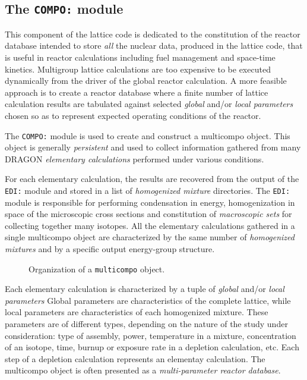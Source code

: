 \subsection{The {\tt COMPO:} module}\label{sect:COMPOData}

This component of the lattice code is dedicated to the constitution of the
reactor database intended to store {\sl all} the nuclear data, produced in
the lattice code, that is useful
in reactor calculations including fuel management and space-time kinetics.
Multigroup lattice calculations are too expensive to be executed dynamically
from the driver of the global reactor calculation. A more feasible
approach is to create a reactor database where a finite number of lattice
calculation results are tabulated against selected {\sl global} and/or {\sl local parameters}
chosen so as to represent expected operating conditions of the reactor.

\vskip 0.1cm

The {\tt COMPO:} module is used to create and construct a {\sc multicompo} object.
This object is generally {\sl persistent} and used to collect information gathered
from many DRAGON {\sl elementary calculations} performed under various conditions.

\vskip 0.1cm

For each elementary calculation, the results are recovered from the output of the
{\tt EDI:} module and stored in a list of {\sl homogenized mixture}
directories. The {\tt EDI:} module is responsible for performing condensation
in energy, homogenization in space of the microscopic cross sections and constitution
of {\sl macroscopic sets} for collecting together many isotopes. All the elementary
calculations gathered in a single {\sc multicompo} object are characterized by the same
number of {\sl homogenized mixtures} and by a specific output energy-group structure.

\vskip 0.1cm

\begin{figure}[h!]
\begin{center} 
\epsfxsize=9cm
\centerline{ }
\parbox{15cm}{\caption{Organization of a {\tt multicompo} 
object.}\label{fig:compo}}   
\end{center}  
\end{figure}

Each elementary calculation is characterized by a tuple of {\sl global} and/or {\sl local parameters}
Global parameters are characteristics of the complete lattice, while local parameters
are characteristics of each homogenized mixture. These parameters are of different types,
depending on the nature of the
study under consideration: type of assembly, power, temperature in a mixture,
concentration of an isotope, time, burnup or exposure rate in a depletion calculation,
etc. Each step of a depletion calculation represents an elementay calculation.
The {\sc multicompo} object is often presented as a {\sl multi-parameter reactor database}.

